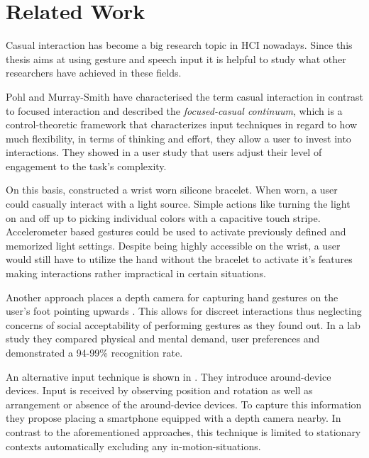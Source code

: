 \chapter{Related Work}\label{ch:relatedwork}

Casual interaction has become a big research topic in \ac{HCI} nowadays. Since this thesis aims at using gesture and speech input it is helpful to study what other researchers have achieved in these fields.

Pohl and Murray-Smith \cite{pohl2013focused} have characterised the term casual interaction in contrast to focused interaction and described the \textit{focused-casual continuum}, which is a control-theoretic framework that characterizes input techniques in regard to how much flexibility, in terms of thinking and effort, they allow a user to invest into interactions. They showed in a user study that users adjust their level of engagement to the task's complexity.

On this basis, \cite{Busse2014Thesis} constructed a wrist worn silicone bracelet. When worn, a user could casually interact with a light source. Simple actions like turning the light on and off up to picking individual colors with a capacitive touch stripe. Accelerometer based gestures could be used to activate previously defined and memorized light settings. Despite being highly accessible on the wrist, a user would still have to utilize the hand without the bracelet to activate it's features making interactions rather impractical in certain situations.

Another approach places a depth camera for capturing hand gestures on the user's foot pointing upwards \cite{bailly2012shoesense}. This allows for discreet interactions thus neglecting concerns of social acceptability of performing gestures as they found out. In a lab study they compared physical and mental demand, user preferences and demonstrated a 94-99\% recognition rate.

An alternative input technique is shown in \cite{pohl2014around}. They introduce around-device devices. Input is received by observing position and rotation as well as arrangement or absence of the around-device devices. To capture this information they propose placing a smartphone equipped with a depth camera nearby.  In contrast to the aforementioned approaches, this technique is limited to stationary contexts automatically excluding any in-motion-situations.

